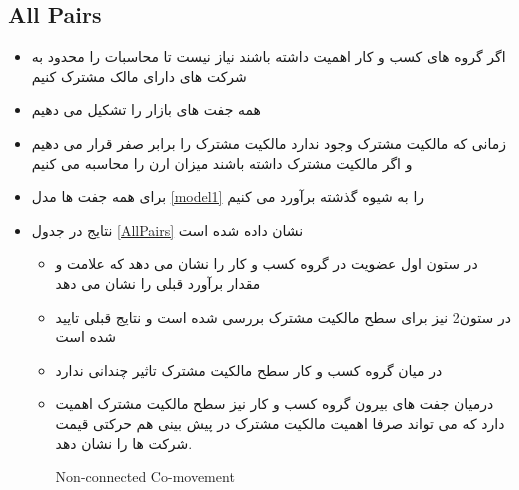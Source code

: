 \documentclass[12pt, a4paper]{article}
\begin{document}
\subsection{All Pairs}
\begin{itemize}
	\item 
	اگر گروه های کسب و کار اهمیت داشته باشند نیاز نیست تا محاسبات را محدود به شرکت های دارای مالک مشترک کنیم
	\item
	همه جفت های بازار را تشکیل می دهیم
	\item
	زمانی که مالکیت مشترک وجود ندارد مالکیت مشترک را برابر صفر قرار می دهیم و اگر مالکیت مشترک داشته باشند میزان ارن را محاسبه می کنیم
	\item
	برای همه جفت ها مدل 
	\ref{model1}
	را به شیوه گذشته برآورد می کنیم
	\item
	نتایج در جدول 
	\ref{AllPairs}
	نشان داده شده است
	\begin{itemize}
		\item 
		در ستون اول عضویت در گروه کسب و کار را نشان می دهد که علامت و مقدار برآورد قبلی را نشان می دهد
		\item 
		در ستون2 نیز برای سطح مالکیت مشترک بررسی شده است و نتایج قبلی تایید شده است
		\item 
		در میان گروه کسب و کار سطح مالکیت مشترک تاثیر چندانی ندارد
		\item
		درمیان جفت های بیرون گروه کسب و کار نیز سطح مالکیت مشترک اهمیت دارد که می تواند صرفا اهمیت مالکیت مشترک در پیش بینی هم حرکتی قیمت شرکت ها را نشان دهد.
			\begin{table}[p]
					\caption{Non-connected Co-movement}
					\label{AllPairs}
					\resizebox{1\textwidth}{!}{
					\begin{LTR}
						\lr{	
					}
					\end{LTR}}
				\end{table}
	\end{itemize}
	
\end{itemize}






\FloatBarrier
\end{document}
